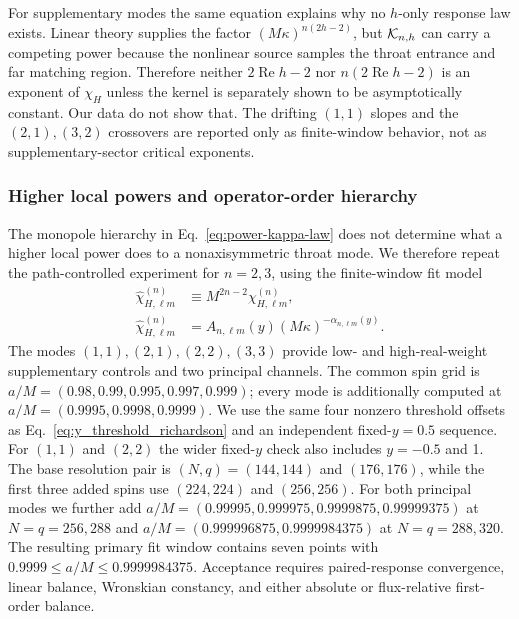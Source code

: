 \documentclass[aps,prd,twocolumn,10pt,nofootinbib,superscriptaddress,floatfix]{revtex4-2}
\begin{document}
For supplementary modes the same equation explains why no $h$-only response
law exists.  Linear theory supplies the factor
$(M\kappa)^{n(2h-2)}$, but ${\cal K}_{n,h}$ can carry a competing power because
the nonlinear source samples the throat entrance and far matching region.
Therefore neither $2\operatorname{Re}h-2$ nor
$n(2\operatorname{Re}h-2)$ is an exponent of $\chi_H$ unless the kernel is
separately shown to be asymptotically constant.  Our data do not show that.
The drifting $(1,1)$ slopes and the $(2,1),(3,2)$ crossovers are reported only
as finite-window behavior, not as supplementary-sector critical exponents.

\subsubsection{Higher local powers and operator-order hierarchy}

The monopole hierarchy in Eq.~\eqref{eq:power-kappa-law} does not determine
what a higher local power does to a nonaxisymmetric throat mode.  We therefore
repeat the path-controlled experiment for $n=2,3$, using the finite-window
fit model
\begin{equation}
 \begin{aligned}
 \widehat\chi_{H,\ell m}^{(n)}
 &\equiv M^{2n-2}\chi_{H,\ell m}^{(n)},\\
 \widehat\chi_{H,\ell m}^{(n)}
 &=A_{n,\ell m}(y)(M\kappa)^{-\alpha_{n,\ell m}(y)} .
 \end{aligned}
 \label{eq:power-modal-fit}
\end{equation}
The modes $(1,1),(2,1),(2,2),(3,3)$ provide low- and high-real-weight
supplementary controls and two principal channels.  The common spin grid is
$a/M=(0.98,0.99,0.995,0.997,0.999)$; every mode is additionally computed at
$a/M=(0.9995,0.9998,0.9999)$.  We use the same four nonzero threshold offsets
as Eq.~\eqref{eq:y_threshold_richardson} and an independent fixed-$y=0.5$
sequence.  For $(1,1)$ and $(2,2)$ the wider fixed-$y$ check also includes
$y=-0.5$ and 1.  The base resolution pair is $(N,q)=(144,144)$ and
$(176,176)$, while the first three added spins use $(224,224)$ and $(256,256)$.
For both principal modes we further add
$a/M=(0.99995,0.999975,0.9999875,0.99999375)$ at $N=q=256,288$ and
$a/M=(0.999996875,0.9999984375)$ at $N=q=288,320$.  The resulting primary
fit window contains seven points with $0.9999\leq a/M\leq0.9999984375$.
Acceptance requires paired-response convergence, linear balance, Wronskian
constancy, and either absolute or flux-relative first-order balance.
\end{document}
